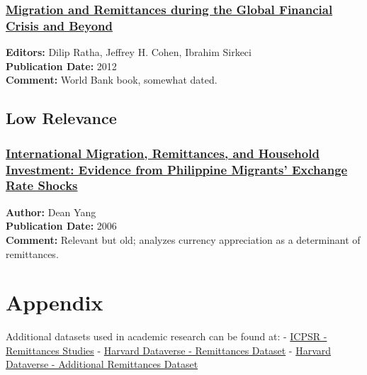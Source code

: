 \documentclass[
  11pt,
]{article}
\begin{document}
\subsubsection{\texorpdfstring{\href{https://documents1.worldbank.org/curated/en/701621468149081927/pdf/693130PUB0publ067926B09780821388266.pdf}{Migration
and Remittances during the Global Financial Crisis and
Beyond}}{Migration and Remittances during the Global Financial Crisis and Beyond}}\label{migration-and-remittances-during-the-global-financial-crisis-and-beyond}

\textbf{Editors:} Dilip Ratha, Jeffrey H. Cohen, Ibrahim Sirkeci\\
\textbf{Publication Date:} 2012\\
\textbf{Comment:} World Bank book, somewhat dated.

\subsection{Low Relevance}\label{low-relevance}

\subsubsection{\texorpdfstring{\href{http://www.nber.org/papers/w12325}{International
Migration, Remittances, and Household Investment: Evidence from
Philippine Migrants' Exchange Rate
Shocks}}{International Migration, Remittances, and Household Investment: Evidence from Philippine Migrants' Exchange Rate Shocks}}\label{international-migration-remittances-and-household-investment-evidence-from-philippine-migrants-exchange-rate-shocks}

\textbf{Author:} Dean Yang\\
\textbf{Publication Date:} 2006\\
\textbf{Comment:} Relevant but old; analyzes currency appreciation as a
determinant of remittances.

\section{Appendix}\label{appendix}

Additional datasets used in academic research can be found at: -
\href{https://www.icpsr.umich.edu/web/ICPSR/search/studies?start=0&sort=score\%20desc\%2CTITLE_SORT\%20asc&ARCHIVE=ICPSR&PUBLISH_STATUS=PUBLISHED&rows=50&q=Remittances}{ICPSR
- Remittances Studies} -
\href{https://dataverse.harvard.edu/dataset.xhtml?persistentId=doi:10.7910/DVN/I6VB8V}{Harvard
Dataverse - Remittances Dataset} -
\href{https://dataverse.harvard.edu/dataset.xhtml?persistentId=doi:10.7910/DVN/SV0PIW}{Harvard
Dataverse - Additional Remittances Dataset}


\printbibliography
\end{document}

